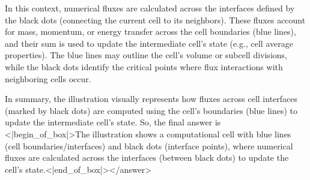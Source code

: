 In this context, numerical fluxes are calculated across the interfaces defined by the black dots (connecting the current cell to its neighbors). These fluxes account for mass, momentum, or energy transfer across the cell boundaries (blue lines), and their sum is used to update the intermediate cell’s state (e.g., cell average properties). The blue lines may outline the cell’s volume or subcell divisions, while the black dots identify the critical points where flux interactions with neighboring cells occur.  

In summary, the illustration visually represents how fluxes across cell interfaces (marked by black dots) are computed using the cell’s boundaries (blue lines) to update the intermediate cell’s state.  
So, the final answer is <|begin_of_box|>The illustration shows a computational cell with blue lines (cell boundaries/interfaces) and black dots (interface points), where numerical fluxes are calculated across the interfaces (between black dots) to update the cell’s state.<|end_of_box|></answer>